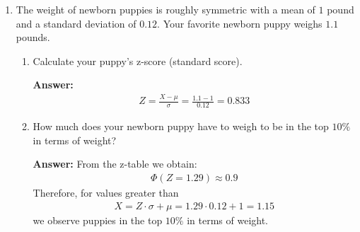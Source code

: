 \documentclass{article}
\newenvironment{QandA}{\begin{enumerate}[label=\arabic*.]}{\end{enumerate}}
\newenvironment{InnerQandA}{\begin{enumerate}[label=\roman*.]}{\end{enumerate}}
\newenvironment{answer}{\par\normalfont \textbf{Answer:}}{}
\begin{document}
\begin{QandA}
\begin{answer}
\begin{align*}
        \end{align*}
        With this, we showed that $\rho \in [-1, 1]$.\\\\
        The correlation coefficient has two main characteristics:
        \begin{itemize}
            \item Strength -- signified by the absolute value of the coefficient. When the absolute value is $1$, then there is a perfect linear relationship between the variables. When the value is $0$, then there is no linear relationship. Finally, when the absolute value is between $0$ and $1$, then there is some linear relationship, but its strength depends on the value, and in general not all points fall on a single line.
            \item Direction -- signified by the sign of the coefficient. Positive correlation indicates that as the value of one variable increases, the value of the other variable also tends to increase. On the other hand, negative correlation indicates that as the value of one variable increases, the value of the other variable tends to decrease.
        \end{itemize}
        (Source: \href{https://en.wikipedia.org/wiki/Cauchy%E2%80%93Schwarz_inequality}{Wikipedia}, \href{https://statisticsbyjim.com/basics/correlations/}{StatisticsByJim})
    \end{answer}

    \item The weight of newborn puppies is roughly symmetric with a mean of $1$ pound and a standard deviation of $0.12$. Your favorite newborn puppy weighs $1.1$ pounds.
    \begin{InnerQandA}
        \item Calculate your puppy’s z-score (standard score).
        \begin{answer}
            \begin{align*}
                Z = \frac{X - \mu}{\sigma} = \frac{1.1 - 1}{0.12} = 0.833
            \end{align*}
        \end{answer}
        
        \item How much does your newborn puppy have to weigh to be in the top $10\%$ in terms of weight?
        \begin{answer}
            From the z-table we obtain:
            \begin{align*}
                \Phi(Z = 1.29) \approx 0.9
            \end{align*}
            Therefore, for values greater than 
            \begin{align*}
                X = Z \cdot \sigma + \mu = 1.29 \cdot 0.12 + 1 = 1.15
            \end{align*}
            we observe puppies in the top $10\%$ in terms of weight.
        \end{answer}


\end{InnerQandA}
\end{QandA}
\end{document}
